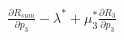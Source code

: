 \documentclass[preview]{standalone}
\begin{document}
\begin{align*}
\frac{\partial {R_{sum}}}{\partial {p_3}} - \lambda^\ast + \mu_3^\ast \frac{\partial {R_3}}{\partial {p_3}}
\end{align*}
\end{document}
